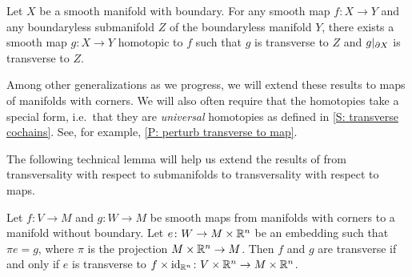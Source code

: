 \begin{theorem}
	Let $X$ be a smooth manifold with boundary.
	For any smooth map $f \colon X \to Y$ and any boundaryless submanifold $Z$ of the boundaryless manifold $Y$, there exists a smooth map $g \colon X \to Y$ homotopic to $f$ such that $g$ is transverse to $Z$ and $g|_{\partial X}$ is transverse to $Z$.
\end{theorem}

Among other generalizations as we progress, we will extend these results to maps of manifolds with corners.
We will also often require that the homotopies take a special form, i.e.\ that they are \textit{universal} homotopies as defined in \cref{S: transverse cochains}.
See, for example, \cref{P: perturb transverse to map}.

The following technical lemma will help us extend the results of \cite{GuPo74} from transversality with respect to submanifolds to transversality with respect to maps.

\begin{lemma}\label{L: all transversality is wrt embeddings}
	Let $f \colon V \to M$ and $g \colon W \to M$ be smooth maps from manifolds with corners to a manifold without boundary.
	Let $e \colon W \to M \times \mathbb{R}^n$ be an embedding such that $\pi e = g$, where $\pi$ is the projection $M \times \mathbb{R}^n \to M$.
	Then $f$ and $g$ are transverse if and only if $e$ is transverse to $f \times \mathrm{id}_{\mathbb{R}^n} \colon V \times \mathbb{R}^n \to M \times \mathbb{R}^n$.
\end{lemma}

